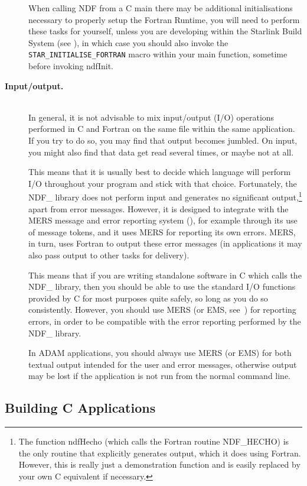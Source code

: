 \begin{description}
When calling NDF from a C main there may be additional initialisations
necessary to properly setup the Fortran Runtime, you will need to perform
these tasks for yourself, unless you are developing within the Starlink Build
System (see ), in which case you should also invoke the 
\texttt{STAR\_INITIALISE\_FORTRAN} macro within your main function, sometime
before invoking ndfInit.

\item[{\bf{Input/output.}}]\mbox{}\\
In general, it is not advisable to mix input/output (I/O) operations
performed in C and Fortran on the same file within the same
application.  If you try to do so, you may find that output becomes
jumbled. On input, you might also find that data get read several
times, or maybe not at all.

This means that it is usually best to decide which language will
perform I/O throughout your program and stick with that
choice. Fortunately, the NDF\_ library does not perform input and
generates no significant output,\footnote{The function ndfHecho (which
calls the Fortran routine NDF\_HECHO) is the only routine that
explicitly generates output, which it does using Fortran. However,
this is really just a demonstration function and is easily replaced by
your own C equivalent if necessary.} apart from error
messages. However, it is designed to integrate with the MERS message
and error reporting system (), for example
through its use of message tokens, and it uses MERS for reporting its
own errors. MERS, in turn, uses Fortran to output these error messages
(in  applications it may also pass output to other
tasks for delivery).

This means that if you are writing standalone software in C which
calls the NDF\_ library, then you should be able to use the standard
I/O functions provided by C for most purposes quite safely, so long as
you do so consistently. However, you should use MERS (or EMS,
see~) for reporting errors, in order to be
compatible with the error reporting performed by the NDF\_ library.

In ADAM applications, you should always use MERS (or EMS) for both
textual output intended for the user and error messages, otherwise
output may be lost if the application is not run from the normal
command line.
\end{description}

\subsection{Building C Applications}


